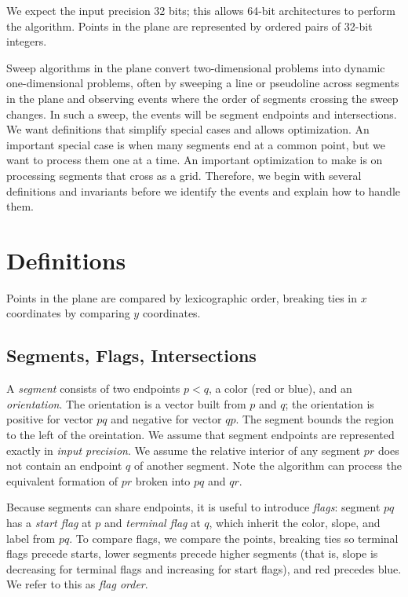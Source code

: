 \documentclass[11pt]{article}
\begin{document}
We expect the input precision 32 bits; this allows 64-bit architectures to perform the algorithm.
Points in the plane are represented by ordered pairs of 32-bit integers.

Sweep algorithms in the plane convert two-dimensional problems into dynamic one-dimensional problems,
often by sweeping a line or pseudoline across segments in the
plane and observing events where the order of segments crossing the sweep changes.
In such a sweep,  the events will be segment endpoints and intersections. 
We want definitions that simplify special cases and allows optimization.
An important special case is when many segments end at a common point, but we want to process them one at a time.
An important optimization to make is on processing segments that cross as a grid.  
Therefore, we begin with several definitions and invariants before we identify the events and explain how to handle them. 

\section{Definitions}
Points in the plane are compared by lexicographic order, breaking ties in $x$ coordinates by comparing $y$ coordinates.

\subsection{Segments, Flags, Intersections}
A \textit{segment} consists of two endpoints $p<q$, a color (red or blue), and an \textit{orientation}.
The orientation is a vector built from $p$ and $q$; the orientation is positive for vector $pq$  and negative for vector $qp$.
The segment bounds the region to the left of the oreintation.
We assume that segment endpoints are represented exactly in {\it input precision}.
We assume the relative interior of any segment $pr$ does not contain an endpoint $q$ of another segment.
Note the algorithm can process the equivalent formation of $pr$ broken into $pq$ and $qr$.

Because segments can share endpoints, it is useful to introduce \textit{flags}: segment $pq$ has a \textit{start flag} at $p$ and \textit{terminal flag} at $q$, which inherit the color, slope, and label from $pq$. 
To compare flags, we compare the points, breaking ties so terminal flags precede starts, lower segments precede higher segments (that is, slope is decreasing for terminal flags and increasing for start flags), and red precedes blue.
We refer to this as \textit{flag order}.
\end{document}
